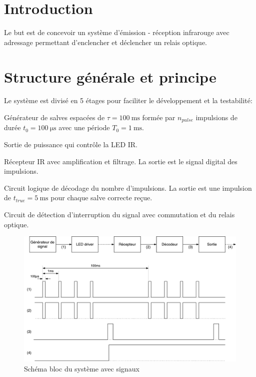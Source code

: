 \documentclass[french]{layout/Report}
\begin{document}


\section{Introduction}
Le but est de concevoir un système d'émission - réception infrarouge avec adressage
permettant d'enclencher et déclencher un relais optique.

\section{Structure générale et principe}

Le système est divisé en 5 étages pour faciliter le développement et la testabilité:

\begin{description}[leftmargin=!,labelwidth=4cm, labelindent=\parindent]
	\item[Générateur de signal] Générateur de salves espacées de $\tau = \SI{100}{\milli\second}$ formée par $n_{pulse}$ impulsions de durée $t_0 =  \SI{100}{\micro\second}$ avec une période $T_0 = \SI{1}{\milli\second}$. 
\item[LED driver] Sortie de puissance qui contrôle la LED IR.
\item[Récepteur] Récepteur IR avec amplification et filtrage. La sortie est le signal digital des impulsions.
\item[Décodeur] Circuit logique de décodage du nombre d'impulsions. La sortie est une impulsion de $t_{true} = \SI{5}{\milli\second}$ pour chaque salve correcte reçue.
\item[Sortie] Circuit de détection d'interruption du signal avec commutation et du relais optique.
\end{description}

\begin{figure}[H]
\centering
\vspace{5mm}
\includegraphics[width=\textwidth]{fig/IRemote_schema_structure}
\caption{Schéma bloc du système avec signaux}
\label{fig:schema_bloc}
\vspace{5mm}
\end{figure}
\end{document}
